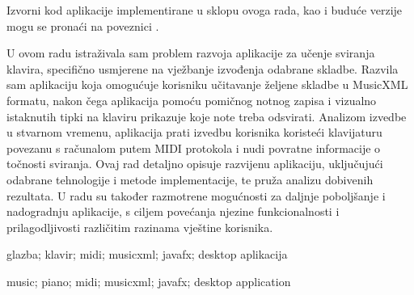 \documentclass[diplomskirad, upload]{fer}
\begin{document}
Izvorni kod aplikacije implementirane u sklopu ovoga rada, kao i buduće verzije mogu se pronaći na poveznici \cite{gitrepo}.






\begin{sazetak}
U ovom radu istraživala sam problem razvoja aplikacije za učenje sviranja klavira, specifično usmjerene na vježbanje izvođenja odabrane skladbe. Razvila sam aplikaciju koja omogućuje korisniku učitavanje željene skladbe u MusicXML formatu, nakon čega aplikacija pomoću pomičnog notnog zapisa i vizualno istaknutih tipki na klaviru prikazuje koje note treba odsvirati. Analizom izvedbe u stvarnom vremenu, aplikacija prati izvedbu korisnika koristeći klavijaturu povezanu s računalom putem MIDI protokola i nudi povratne informacije o točnosti sviranja. Ovaj rad detaljno opisuje razvijenu aplikaciju, uključujući odabrane tehnologije i metode implementacije, te pruža analizu dobivenih rezultata. U radu su također razmotrene mogućnosti za daljnje poboljšanje i nadogradnju aplikacije, s ciljem povećanja njezine funkcionalnosti i prilagodljivosti različitim razinama vještine korisnika.
\end{sazetak}

\begin{kljucnerijeci}
glazba; klavir; midi; musicxml; javafx; desktop aplikacija
\end{kljucnerijeci}

\begin{abstract}
In this thesis, I explored the development of an application designed for learning piano playing, specifically aimed at practicing the performance of selected pieces. I developed an application that allows users to load their chosen piece in MusicXML format, after which the application displays the notes to be played using a scrolling sheet music view and visually highlighted piano keys. By analyzing the performance in real-time, the application evaluates the user's playing using a keyboard connected to the computer via MIDI protocol and provides feedback on the accuracy of the performance. This thesis provides a detailed description of the developed application, including the chosen technologies and implementation methods, and offers an analysis of the obtained results. The thesis also considers possibilities for further improvement and enhancement of the application, with the goal of increasing its functionality and adaptability to different skill levels of users.
\end{abstract}

\begin{keywords}
music; piano; midi; musicxml; javafx; desktop application
\end{keywords}
\end{document}
